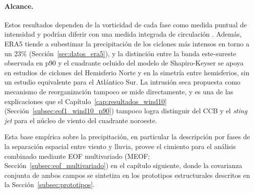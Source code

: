 \paragraph{Alcance.}
Estos resultados dependen de la vorticidad de cada fase como medida puntual de intensidad y podrían diferir con una medida integrada de circulación \citep{sinclair1997objective}. Además, ERA5 tiende a subestimar la precipitación de los ciclones más intensos en torno a un 23\% \citep{chen2024evaluation} (Sección~\ref{sec:datos_era5}), y la distinción entre la banda este-sureste observada en p90 y el cuadrante ocluido del modelo de Shapiro-Keyser se apoya en estudios de ciclones del Hemisferio Norte \citep{martin1999forcing, sawada2021heavy} y en la simetría entre hemisferios, sin un estudio equivalente para el Atlántico Sur. La intrusión seca propuesta como mecanismo de reorganización tampoco se mide directamente, y es una de las explicaciones que el Capítulo~\ref{cap:resultados_wind10} (Sección~\ref{subsec:eof1_wind10_p90}) tampoco logra distinguir del CCB y el \textit{sting jet} para el núcleo de viento del cuadrante noroeste.

Esta base empírica sobre la precipitación, en particular la descripción por fases de la separación espacial entre viento y lluvia, provee el cimiento para el análisis combinado mediante EOF multivariado (MEOF; Sección~\ref{subsec:eof_multivariado}) en el capítulo siguiente, donde la covarianza conjunta de ambos campos se sintetiza en los prototipos estructurales descritos en la Sección~\ref{subsec:prototipos}.
